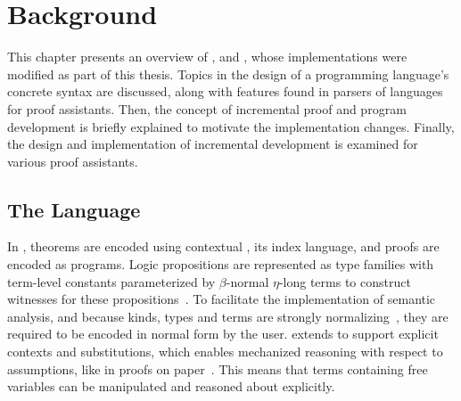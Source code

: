 \chapter{Background}\label{chapter:background}

This chapter presents an overview of \Beluga, and \Harpoon, whose implementations were modified as part of this thesis.
Topics in the design of a programming language's concrete syntax are discussed, along with features found in parsers of languages for proof assistants.
Then, the concept of incremental proof and program development is briefly explained to motivate the implementation changes.
Finally, the design and implementation of incremental development is examined for various proof assistants.

\section{The \Beluga Language}

In \Beluga, theorems are encoded using contextual \LF, its index language, and proofs are encoded as programs.
Logic propositions are represented as \LF type families with term-level constants parameterized by $\beta$-normal $\eta$-long \LF terms to construct witnesses for these propositions~\cite{nanevski2008contextual, foundation2008pientka, DBLP:journals/corr/abs-1009-2789}.
To facilitate the implementation of semantic analysis, and because \LF kinds, types and terms are strongly normalizing~\cite{harper1993framework}, they are required to be encoded in normal form by the user.
\Beluga extends \LF to support explicit contexts and substitutions, which enables mechanized reasoning with respect to assumptions, like in proofs on paper~\cite{pientka2010programming}.
This means that terms containing free variables can be manipulated and reasoned about explicitly.

